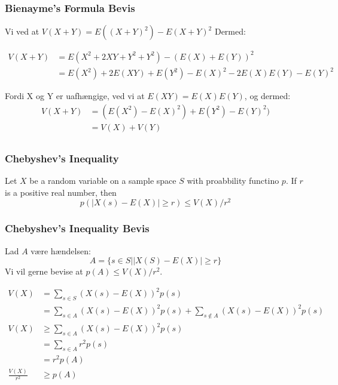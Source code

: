 \documentclass{beamer}
\begin{document}
\begin{frame}
  \frametitle{Bienayme's Formula Bevis}
  Vi ved at $V(X+Y) = E((X+Y)^{2}) - E(X+Y)^{2}$ Dermed:

  \begin{equation*}
    \begin{split}
      V(X+Y) &= E(X^{2} + 2XY + Y^{2}+Y^{2})-(E(X)+E(Y))^{2}\\
             &= E(X^{2}) +2E(XY)+E(Y^{2})-E(X)^{2}-2E(X)E(Y)-E(Y)^{2}
    \end{split}
  \end{equation*}

  Fordi X og Y er uafhængige, ved vi at $E(XY) = E(X)E(Y)$, og dermed:
  \begin{equation*}
    \begin{split}
      V(X+Y) &= (E(X^{2})-E(X)^{2})+E(Y^{2})-E(Y)^{2})\\
             &= V(X)+V(Y)\\
    \end{split}
  \end{equation*}
\end{frame}

\begin{frame}
  \frametitle{Chebyshev's Inequality}
  \begin{theorem}
    Let $X$ be a random variable on a sample space $S$ with proabbility functino $p$. If $r$ is a positive real number, then
    \begin{equation*}
      p(|X(s) - E(X)| \geq r) \leq V(X)/r^{2}
    \end{equation*}

  \end{theorem}
\end{frame}

\begin{frame}
  \frametitle{Chebyshev's Inequality Bevis}
  Lad $A$ være hændelsen:
  \begin{equation}
    A = \{s \in S | |X(S) - E(X)| \geq r\}
  \end{equation}
  Vi vil gerne bevise at $p(A) \leq V(X)/r^{2}$.

  \begin{equation}
    \begin{split}
      V(X) &= \sum_{s \in S} (X(s) - E(X))^{2}p(s)\\
           &= \sum_{s \in A} (X(s) - E(X))^{2}p(s) + \sum_{s \notin A} (X(s) - E(X))^{2} p(s)\\
      V(X) &\geq \sum_{s \in A} (X(s) - E(X))^{2}p(s) \\
           &= \sum_{s \in A} r^{2}p(s) \\
           &= r^{2}p(A)\\
      \frac{V(X)}{r^{2}} &\geq p(A)\\
    \end{split}
  \end{equation}
\end{frame}
\end{document}
